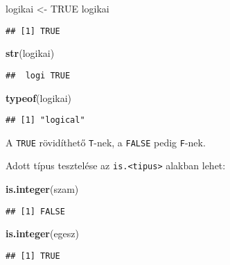 \documentclass[]{book}
\newenvironment{Shaded}{\begin{snugshade}}{\end{snugshade}}
\newcommand{\KeywordTok}[1]{\textcolor[rgb]{0.13,0.29,0.53}{\textbf{#1}}}
\newcommand{\NormalTok}[1]{#1}
\newcommand{\OtherTok}[1]{\textcolor[rgb]{0.56,0.35,0.01}{#1}}
\newcommand{\StringTok}[1]{\textcolor[rgb]{0.31,0.60,0.02}{#1}}
\begin{document}
\begin{Shaded}
\begin{Highlighting}[]
\NormalTok{logikai <-}\StringTok{ }\OtherTok{TRUE}
\NormalTok{logikai}
\end{Highlighting}
\end{Shaded}

\begin{verbatim}
## [1] TRUE
\end{verbatim}

\begin{Shaded}
\begin{Highlighting}[]
\KeywordTok{str}\NormalTok{(logikai)}
\end{Highlighting}
\end{Shaded}

\begin{verbatim}
##  logi TRUE
\end{verbatim}

\begin{Shaded}
\begin{Highlighting}[]
\KeywordTok{typeof}\NormalTok{(logikai)}
\end{Highlighting}
\end{Shaded}

\begin{verbatim}
## [1] "logical"
\end{verbatim}

A \texttt{TRUE} rövidíthető \texttt{T}-nek, a \texttt{FALSE} pedig \texttt{F}-nek.

Adott típus tesztelése az \texttt{is.\textless{}tipus\textgreater{}} alakban lehet:

\begin{Shaded}
\begin{Highlighting}[]
\KeywordTok{is.integer}\NormalTok{(szam)}
\end{Highlighting}
\end{Shaded}

\begin{verbatim}
## [1] FALSE
\end{verbatim}

\begin{Shaded}
\begin{Highlighting}[]
\KeywordTok{is.integer}\NormalTok{(egesz)}
\end{Highlighting}
\end{Shaded}

\begin{verbatim}
## [1] TRUE
\end{verbatim}
\end{document}
